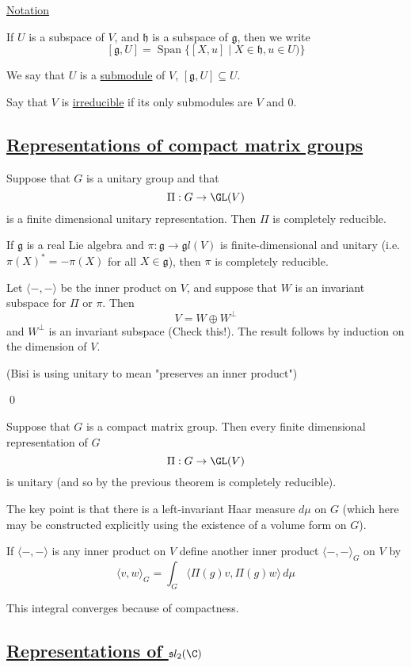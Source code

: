 \documentclass[x11names,reqno,14pt]{extarticle}
\newcommand{\mk}[1]{\mathfrak{#1}}
\newcommand{\g}{\mk{g}}
\newcommand{\h}{\mk{h}}
\begin{document}
\underline{Notation}

If $U$ is a subspace of $V$, and $\h$ is a subspace of $\g$, then we write
\[
[\g,U] = \operatorname{Span}\{[X, u] \mid X \in \h, u \in U)\}
\]


We say that $U$ is a \underline{submodule} of $V$, $[\g,U] \subseteq U$. 

Say that $V$ is \underline{irreducible} if its only submodules are $V$ and 0. 

\subsection*{\underline{Representations of compact matrix groups}}

\thm

Suppose that $G$ is a unitary group and that 
\[
\Pi:G\to \GL(V)
\]
is a finite dimensional unitary representation. Then $\Pi$ is completely reducible. 

If $\g$ is a real Lie algebra and $\pi:\g\to\g l(V)$ is finite-dimensional and unitary (i.e. $\pi(X)^* = -\pi(X)$ for all $X \in \g$), then $\pi$ is completely reducible. 

\proof

Let $\langle-,-\rangle$ be the inner product on $V$, and suppose that $W$ is an invariant subspace for $\Pi$ or $\pi$. Then 
\[
V = W \oplus W^\perp
\]
and $W^\perp$ is an invariant subspace (Check this!). The result follows by induction on the dimension of $V$.

(Bisi is using unitary to mean "preserves an inner product")

\qed

\thm

Suppose that $G$ is a compact matrix group. Then every finite dimensional representation of $G$
\[
\Pi:G\to\GL(V)
\]
is unitary (and so by the previous theorem is completely reducible). 

\proof

The key point is that there is a left-invariant Haar measure $d\mu$ on $G$ (which here may be constructed explicitly using the existence of a volume form on $G$). 

If $\langle -, - \rangle$ is any inner product on $V$ define another inner product $\langle-,-\rangle_G$ on $V$ by 
\[
\langle v,w\rangle_G = \int_G\langle \Pi(g)v, \Pi(g)w\rangle\,d\mu
\]

This integral converges because of compactness. 

\subsection*{\underline{Representations of $\mk{s}l_2(\C)$}}
\end{document}
